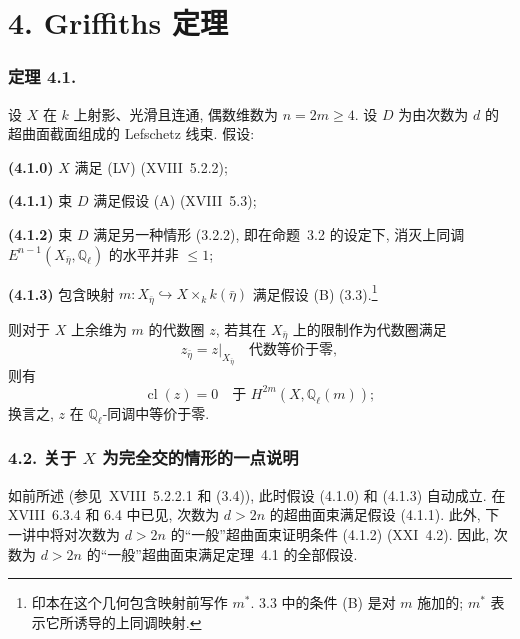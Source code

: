 \section*{4. Griffiths 定理}

\subsubsection*{定理 4.1.}
设 $X$ 在 $k$ 上射影、光滑且连通, 偶数维数为 $n=2m\geq4$. 设 $D$ 为由次数为 $d$ 的超曲面截面组成的 Lefschetz 线束. 假设:

\medskip
\noindent\textbf{(4.1.0)} $X$ 满足 (LV) (XVIII~5.2.2);

\noindent\textbf{(4.1.1)} 束 $D$ 满足假设 (A) (XVIII~5.3);

\noindent\textbf{(4.1.2)} 束 $D$ 满足另一种情形 (3.2.2), 即在命题~3.2 的设定下, 消灭上同调 $E^{n-1}(X_{\bar\eta},\mathbb Q_\ell)$ 的水平并非 $\leq1$;

\noindent\textbf{(4.1.3)} 包含映射 $m:X_{\bar\eta}\hookrightarrow X\times_k k(\bar\eta)$ 满足假设 (B) (3.3).\footnote{印本在这个几何包含映射前写作 $m^*$. 3.3 中的条件 (B) 是对 $m$ 施加的; $m^*$ 表示它所诱导的上同调映射.}

\medskip
则对于 $X$ 上余维为 $m$ 的代数圈 $z$, 若其在 $X_{\bar\eta}$ 上的限制作为代数圈满足
\begin{equation}\tag{4.1.4}
z_{\bar\eta}=z|_{X_{\bar\eta}}
\quad\text{代数等价于零},
\end{equation}
则有
\begin{equation}\tag{4.1.5}
\operatorname{cl}(z)=0
\quad\text{于 }H^{2m}(X,\mathbb Q_\ell(m));
\end{equation}
换言之, $z$ 在 $\mathbb Q_\ell$-同调中等价于零.

\subsubsection*{4.2. 关于 $X$ 为完全交的情形的一点说明}
如前所述 (参见~XVIII~5.2.2.1 和 (3.4)), 此时假设 (4.1.0) 和 (4.1.3) 自动成立. 在 XVIII~6.3.4 和 6.4 中已见, 次数为 $d>2n$ 的超曲面束满足假设 (4.1.1). 此外, 下一讲中将对次数为 $d>2n$ 的``一般''超曲面束证明条件 (4.1.2) (XXI~4.2). 因此, 次数为 $d>2n$ 的``一般''超曲面束满足定理~4.1 的全部假设.

